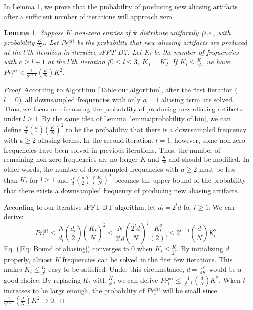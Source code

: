 \documentclass[journal,onecolumn,11pt]{IEEEtran}
\newtheorem{lemma}{Lemma}
\begin{document}
In Lemma \ref{lemma:probabilityofaliasing}, we prove that the probability of producing new aliasing artifacts after a sufficient number of iterations will approach zero.

\begin{lemma}
\label{lemma:probabilityofaliasing}
Suppose $K$ non-zero entries of ${\bm\hat{x}}$ distribute uniformly ({$i.e.$}, with probability $  \frac{K}{N}$).
Let $Pr_{l}^{ali}$ be the probability that new aliasing artifacts are produced at the $l$'th iteration in iterative sFFT-DT. Let $K_{l}$ be the number of frequencies with $a \geq  l+1$ at the $l$'th iteration ($0\leq l\leq 3$, $K_{0}=K$). If $  K_{l} \leq \frac{K}{2^{l}}$, we have $Pr_{l}^{ali} < \frac{1}{2^{l+1}}(\frac{d}{N})K^{2}$.
\end{lemma}

\begin{proof}
According to Algorithm \ref{Table:our algorithm}, after the first iteration ($l=0$), all downsampled frequencies with only $a=1$ aliasing term are solved.
Thus, we focus on discussing the probability of producing new aliasing artifacts under $l \geq 1$.
By the same idea of Lemma \ref{lemma:probability of bin}, we can define $  \frac{N}{d}\binom{d}{2}(\frac{K}{N})^{2}$ to be the probability that there is a downsampled frequency with $a \geq 2$ aliasing terms.
In the second iteration. $l=1$, however, some non-zero frequencies have been solved in previous iterations.
Thus, the number of remaining non-zero frequencies are no longer $K$ and $\frac{K}{N}$ and should be modified.
In other words, the number of downsampled frequencies with $a \geq 2$ must be less than $K_{l}$ for $l\geq 1$ and $  \frac{N}{d}\binom{d}{2}(\frac{K_{l}}{N})^{2}$ becomes the upper bound of the probability that there exists a downsampled frequency of producing new aliasing artifacts.

According to our iterative sFFT-DT algorithm, let $d_{l}=2^ld$ for $l\geq 1$.
We can derive:
\small
\begin{equation}
  Pr_{l}^{ali} \leq \frac{N}{d_{l}} \binom{d_{l}}{2} (\frac{K_{l}}{N})^{2} \leq \frac{N}{2^{l}d}(\frac{2^{l}d}{N})^{2}\frac{K^{2}_{l}}{(2)!}\leq 2^{l-1}(\frac{d}{N})K^{2}_{l}.
\label{Eq: Bound of aliasing}
\end{equation}
\normalsize
Eq. (\ref{Eq: Bound of aliasing}) converges to $0$ when $  K_{l}\leq\frac{K}{2^{l}}$. By initializing $d$ properly, almost $K$ frequencies can be solved in the first few iterations. This makes $  K_{l}\leq\frac{K}{2^{l}}$ easy to be satisfied.
Under this circumstance, $d=\frac{N}{4K}$ would be a good choice. By replacing $K_{l}$ with $  \frac{K}{2^{l}}$, we can derive $Pr_{l}^{ali} \leq \frac{1}{2^{l+1}}(\frac{d}{N})K^{2}$.
When $l$ increases to be large enough, the probability of $Pr_{l}^{ali}$ will be small since $  \frac{1}{2^{l+1}}(\frac{d}{N})K^{2} \rightarrow 0$. \end{proof}
\end{document}

